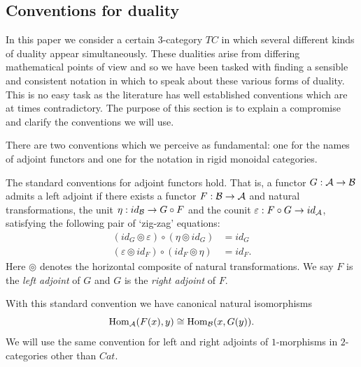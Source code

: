 \documentclass{amsart}
\begin{document}
\subsection{Conventions for duality} \label{sec:conventions}

In this paper we consider a certain 3-category $TC$ in which several different kinds of duality appear simultaneously. These dualities arise from differing mathematical points of view and so we have been tasked with finding a sensible and consistent notation in which to speak about these various forms of duality. This is no easy task as the literature has well established conventions which are at times contradictory.  The purpose of this section is to explain a compromise and clarify the conventions we will use.

There are two conventions which we perceive as fundamental: one for the names of adjoint functors and one for the notation in rigid monoidal categories. 

\begin{definition} \label{def:Adjoints}
	The standard conventions for adjoint functors hold. That is, a functor $G: \mathcal A \to \mathcal B$  admits a left adjoint if there exists a functor $F: \mathcal B \to \mathcal A$ and natural transformations, the  unit $\eta: id_{\mathcal B} \to G \circ F$ and the  counit $\varepsilon: F \circ G \to id_{\mathcal A}$, satisfying the following pair of `zig-zag' equations:
	\begin{align*}
		(id_{G} \circledcirc \varepsilon  ) \circ (  \eta \circledcirc id_{G}) &= id_{G} \\
		(\varepsilon \circledcirc id_{F}) \circ (id_{F} \circledcirc \eta) &= id_{F}.
	\end{align*}
Here $\circledcirc$ denotes the horizontal composite of natural transformations.
We say $F$ is the {\em left adjoint} of $G$ and $G$ is the {\em right adjoint} of $F$.
\end{definition}

\nid With this standard convention we have canonical natural isomorphisms
\begin{equation*}
	\operatorname{Hom}_\mathcal A(F(x), y) \cong \operatorname{Hom}_\mathcal B(x, G(y)).
\end{equation*}
We will use the same convention for left and right adjoints of $1$-morphisms in $2$-categories other than $Cat$.
\end{document}
